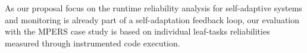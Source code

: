 
As our proposal focus on the runtime reliability analysis for self-adaptive systems and monitoring is already part of a self-adaptation feedback loop, our evaluation with the MPERS case study is based on individual leaf-tasks reliabilities measured through instrumented code execution.



%
%
%
%

